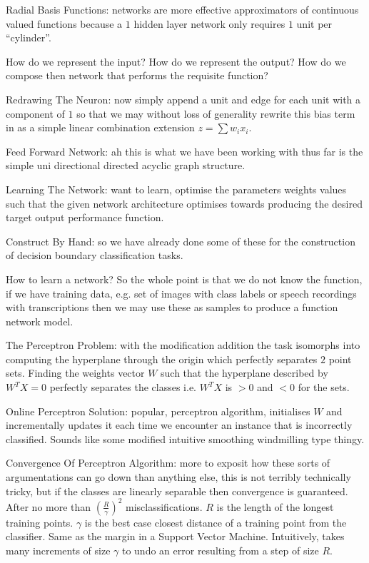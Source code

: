 Radial Basis Functions: networks are more effective approximators of continuous valued functions because a $1$ hidden layer network only requires $1$ unit per ``cylinder''.

How do we represent the input? How do we represent the output? How do we compose then network that performs the requisite function?

Redrawing The Neuron: now simply append a unit and edge for each unit with a component of $1$ so that we may without loss of generality rewrite this bias term in as a simple linear combination extension $z = \sum w_i x_i$.

Feed Forward Network: ah this is what we have been working with thus far is the simple uni directional directed acyclic graph structure.

Learning The Network: want to learn, optimise the parameters weights values such that the given network architecture optimises towards producing the desired target output performance function.

Construct By Hand: so we have already done some of these for the construction of decision boundary classification tasks.

How to learn a network? So the whole point is that we do not know the function, if we have training data, e.g. set of images with class labels or speech recordings with transcriptions then we may use these as samples to produce a function network model.

The Perceptron Problem: with the modification addition the task isomorphs into computing the hyperplane through the origin which perfectly separates $2$ point sets. Finding the weights vector $W$ such that the hyperplane described by $W^T X = 0$ perfectly separates the classes i.e. $W^T X$ is $>0$ and $<0$ for the sets.

Online Perceptron Solution: popular, perceptron algorithm, initialises $W$ and incrementally updates it each time we encounter an instance that is incorrectly classified. Sounds like some modified intuitive smoothing windmilling type thingy.

Convergence Of Perceptron Algorithm: more to exposit how these sorts of argumentations can go down than anything else, this is not terribly technically tricky, but if the classes are linearly separable then convergence is guaranteed. After no more than $\left( \frac{R}{\gamma} \right)^2$ misclassifications. $R$ is the length of the longest training points. $\gamma$ is the best case closest distance of a training point from the classifier. Same as the margin in a Support Vector Machine. Intuitively, takes many increments of size $\gamma$ to undo an error resulting from a step of size $R$.

